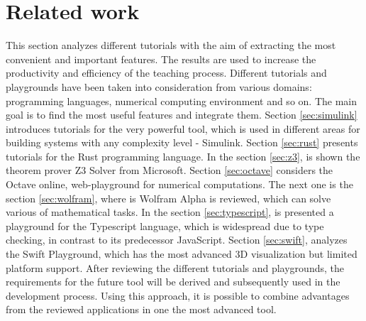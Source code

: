 \chapter{Related work} \label{sec:related}
This section analyzes different tutorials with the aim of extracting the most convenient and important features. The results are used to increase the productivity and efficiency of the teaching process. Different tutorials and playgrounds have been taken into consideration from various domains: programming languages, numerical computing environment and so on. The main goal is to find the most useful features and integrate them.
Section \ref{sec:simulink} introduces tutorials for the very powerful tool, which is used in different areas for building systems with any complexity level - Simulink. Section \ref{sec:rust} presents tutorials for the Rust programming language. In the section \ref{sec:z3}, is shown the theorem prover Z3 Solver from Microsoft. Section \ref{sec:octave} considers the Octave online, web-playground for numerical computations. The next one is the section \ref{sec:wolfram}, where is Wolfram Alpha is reviewed, which can solve various of mathematical tasks. In the section \ref{sec:typescript}, is presented a playground for the Typescript language, which is widespread due to type checking, in contrast to its predecessor JavaScript. Section \ref{sec:swift}, analyzes the Swift Playground, which has the most advanced 3D visualization but limited platform support. After reviewing the different tutorials and playgrounds, the requirements for the future tool will be derived and subsequently used in the development process. Using this approach, it is possible to combine advantages from the reviewed applications in one the most advanced tool.

